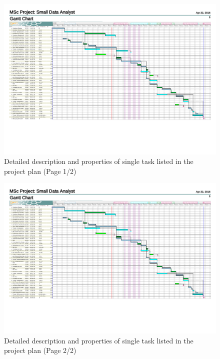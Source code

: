 \begin{figure}
	\centering
	\includegraphics[page=2,width=\textwidth]{appendix/Projectplan.pdf}
	\caption{Detailed description and properties of single task listed in the project plan (Page 1/2)}
	\label{fig:projectplan:details:1}
\end{figure}

\begin{figure}
	\centering
	\includegraphics[page=3,width=\textwidth]{appendix/Projectplan.pdf}
	\caption{Detailed description and properties of single task listed in the project plan (Page 2/2)}
	\label{fig:projectplan:details:2}
\end{figure}
